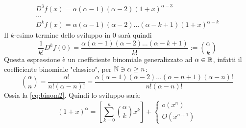 \begin{itemize}
\begin{gather*}
		      D^3f(x)=\alpha(\alpha-1)(\alpha-2)(1+x)^{\alpha-3}\\
		      \dots\\
		      D^kf(x)=\alpha(\alpha-1)(\alpha-2)\dots(\alpha-k+1)(1+x)^{\alpha-k}
	      \end{gather*}
	      Il $k$-esimo termine dello sviluppo in $0$ sarà quindi
	      \begin{equation}
		      \label{eq:binom2}
		      \frac{1}{k!}D^kf(0)=\frac{\alpha(\alpha-1)(\alpha-2)\dots(\alpha-k+1)}{k!}:=\binom{\alpha}{k}
	      \end{equation}
	      Questa espressione è un coefficiente binomiale generalizzato ad $\alpha\in\mathbb{R}$, infatti il coefficiente binomiale "classico", per $\mathbb{N}\ni\alpha\geq n$:
	      \[
		      \binom{\alpha}{n}=\frac{\alpha!}{n!(\alpha-n)!}=\frac{\alpha(\alpha-1)(\alpha-2)\dots(\alpha-n+1)(\alpha-n)!}{n!(\alpha-n)!}
	      \]
	      Ossia la \ref{eq:binom2}. Quindi lo sviluppo sarà:
	      \begin{equation}
		      \label{tay:pow}
		      (1+x)^\alpha=\left[\sum_{k=0}^n \binom{\alpha}{k}x^k\right]+\begin{cases}o(x^n)\\O(x^{n+1})\end{cases}
	      \end{equation}


\end{itemize}

